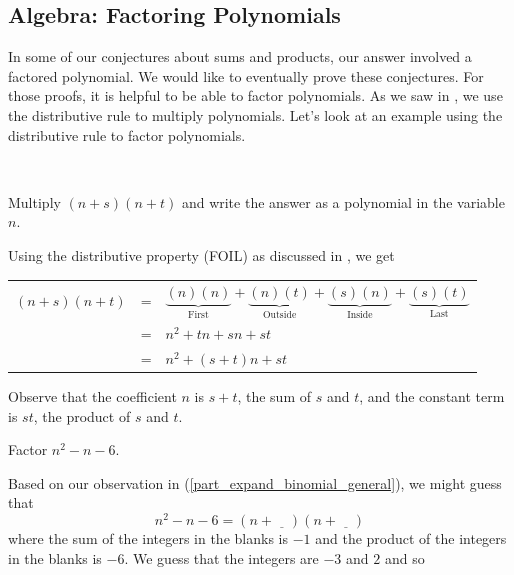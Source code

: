 \newcommand{\subfactorpolys}{Algebra: Factoring Polynomials}
\subsection{\subfactorpolys}
\label{sub_factor_polys}

In some of our conjectures about sums and products, our answer involved a factored polynomial.  We would like to eventually prove these conjectures.  For those proofs, it is helpful to be able to factor polynomials.  As we saw in , we use the distributive rule to multiply polynomials.  Let's look at an example using the distributive rule to factor polynomials.

\begin{exam}
\label{exam_unfoil}  
~
    \begin{apart}
        \item Multiply $(n+s)(n+t)$ and write the answer as a polynomial in the variable $n$.
        \label{part_expand_binomial_general}
            \begin{soln}
                 Using the distributive property (FOIL) as discussed in , we get              
                 \begin{center}
                    \begin{tabular}{lll}
                    $(n+s)(n+t)$ &=& $\underbrace{(n)(n)}_{\text{First}} 
                    +\underbrace{(n)(t)}_{\text{Outside}} 
                    + \underbrace{(s)(n)}_{\text{Inside}} + \underbrace{(s)(t)}_{\text{Last}}$ \\ 
                    &=& $n^2 + tn + sn + st$ \\
                    &=& $n^2+ (s+t)n + st$          
                    \end{tabular}
                \end{center}
                Observe that the coefficient $n$ is $s+t$, the sum of $s$ and $t$, and the constant term is $st$, the product of $s$ and $t$.
            \end{soln}
        \item Factor $n^2 -n-6$.
            \begin{soln}
                Based on our observation in (\ref{part_expand_binomial_general}), we might guess that 
                $$n^2 -n-6 = (n+\underline{\quad})(n+\underline{\quad})$$ 
                where the sum of the integers in the blanks is $-1$ and the product of the integers in the blanks is $-6$. We guess that the integers are $-3$ and $2$ and so

\end{soln}
\end{apart}
\end{exam}
